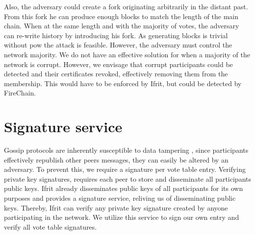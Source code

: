 \documentclass[USenglish]{uit-thesis}
\begin{document}
Also, the adversary could create a fork originating arbitrarily in the distant past.
From this fork he can produce enough blocks to match the length of the main chain.
When at the same length and with the majority of votes, the adversary can re-write history by introducing his fork.
As generating blocks is trivial without \gls{pow} the attack is feasible. 
However, the adversary must control the network majority.
We do not have an effective solution for when a majority of the network is corrupt.
However, we envisage that corrupt participants could be detected and their certificates revoked, effectively removing them from the membership.
This would have to be enforced by Ifrit, but could be detected by FireChain.




\section{Signature service}
Gossip protocols are inherently susceptible to data tampering \cite{gossip_promise}, since participants effectively republish other peers messages, they can easily be altered by an adversary.
To prevent this, we require a signature per vote table entry.
Verifying private key signatures, requires each peer to store and disseminate all participants public keys.
Ifrit already disseminates public keys of all participants for its own purposes and provides a signature service, reliving us of disseminating public keys.
Thereby, Ifrit can verify any private key signature created by anyone participating in the network.
We utilize this service to sign our own entry and verify all vote table signatures.



\end{document}
